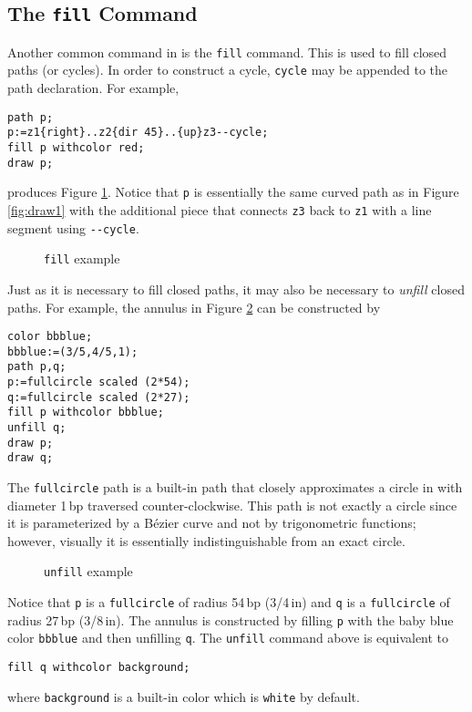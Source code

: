 \subsection{The \texttt{fill} Command}

Another common command in \MP{} is the \texttt{fill} command.  This is used to fill closed paths (or cycles).  In order to construct a cycle, \texttt{cycle} may be appended to the path declaration.  For example,
\begin{lstlisting}[xleftmargin=7bp]
path p;
p:=z1{right}..z2{dir 45}..{up}z3--cycle;
fill p withcolor red;
draw p;
\end{lstlisting}
produces Figure \ref{fig:fill}.  Notice that \texttt{p} is essentially the same curved path as in Figure \ref{fig:draw1} with the additional piece that connects \texttt{z3} back to \texttt{z1} with a line segment using \texttt{-{}-cycle}.
\begin{figure}[hptb]
	\begin{center}\end{center}
	\caption{\texttt{fill} example}\label{fig:fill}
\end{figure}

Just as it is necessary to fill closed paths, it may also be necessary to \textit{unfill} closed paths.  For example, the annulus in Figure \ref{fig:annulus1} can be constructed by
\begin{lstlisting}[xleftmargin=38bp]
color bbblue;
bbblue:=(3/5,4/5,1);
path p,q;
p:=fullcircle scaled (2*54);
q:=fullcircle scaled (2*27);
fill p withcolor bbblue;
unfill q;
draw p;
draw q;
\end{lstlisting}
The \texttt{fullcircle} path is a built-in path that closely approximates a circle in \MP{} with diameter 1\,bp traversed counter-clockwise.  This path is not exactly a circle since it is parameterized by a B\'{e}zier curve and not by trigonometric functions; however, visually it is essentially indistinguishable from an exact circle.
\begin{figure}[hptb]
	\begin{center}\end{center}
	\caption{\texttt{unfill} example}\label{fig:annulus1}
\end{figure}
Notice that \texttt{p} is a \texttt{fullcircle} of radius 54\,bp (3/4\,in) and \texttt{q} is a \texttt{fullcircle} of radius 27\,bp (3/8\,in).  The annulus is constructed by filling \texttt{p} with the baby blue color \texttt{bbblue} and then unfilling \texttt{q}.  The \texttt{unfill} command above is equivalent to \begin{center}\verb|fill q withcolor background;|\end{center} where \texttt{background} is a built-in color which is \texttt{white} by default.

